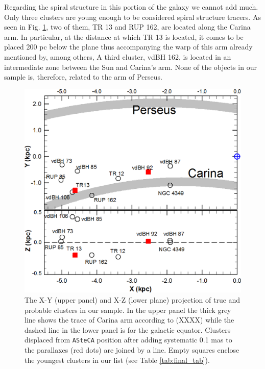 \documentclass[draft]{aa}
\begin{document}
Regarding the spiral structure in this portion of the galaxy we cannot add
much. Only three clusters are young enough to be considered spiral structure
tracers. As seen in Fig. \ref{fig68}, two of them, TR 13 and RUP 162, are
located along the Carina arm. In particular, at the distance at which TR 13 is
located, it comes to be placed 200 pc below the plane thus accompanying the
warp of this arm already mentioned by, among others, \cite{Cersosimo_2009}
A third cluster, vdBH 162, is located in an intermediate zone between the Sun
and Carina's arm. None of the objects in our sample is, therefore, related to
the arm of Perseus.\\

\begin{figure}[ht]
    \centering
    \includegraphics[width=\hsize]{../figs/xy_xz.png}
    \caption{The X-Y (upper panel) and X-Z (lower plane) projection of true and
    probable clusters in our sample. In the upper panel the thick grey line
    shows the trace of Carina arm according to (XXXX) while the dashed line in
    the lower panel is for the galactic equator. Clusters displaced from 
    \texttt{ASteCA} position after adding systematic 0.1 mas to the parallaxes 
    (red dots) are joined by a line. Empty squares enclose the youngest clusters
    in our list (see Table \ref{tab:final_tab}).}
    \label{fig68}
\end{figure}
\end{document}
